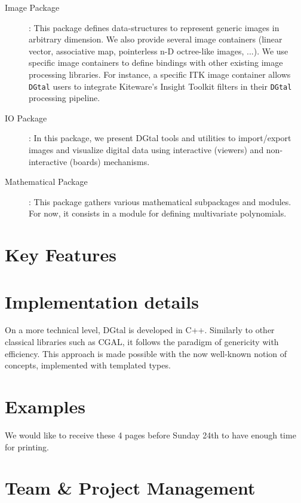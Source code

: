 \documentclass[11pt, a4paper]{article}
\def\DGtal{\texttt{DGtal} }
\begin{document}
\begin{description}
  \item[Image Package]: This package defines data-structures to
    represent generic images in arbitrary dimension. We also provide
    several image containers (linear vector, associative map,
    pointerless n-D octree-like images, ...). We use specific image
    containers to define bindings with other existing image processing
    libraries. For instance, a specific ITK image container allows
    \DGtal users to integrate Kiteware's Insight Toolkit filters in
    their \DGtal processing pipeline. 

  \item[IO Package]: In this package, we present DGtal tools and
    utilities to import/export images and visualize digital data using
    interactive (viewers) and non-interactive (boards) mechanisms.

  \item[Mathematical Package]: This package gathers various
    mathematical subpackages and modules. For now, it consists in a
    module for defining multivariate polynomials.



\end{description}


\section*{Key Features}

\section*{Implementation details}
 
On a more technical level, DGtal is developed in C++. Similarly to
other classical libraries such as CGAL, it follows the paradigm of
genericity with efficiency. This approach is made possible with the
now well-known notion of concepts, implemented with templated types.



\section*{Examples}

We would like to receive these 4 pages before Sunday 24th to have
enough time for printing.

\section*{Team \& Project Management}
\end{document}
